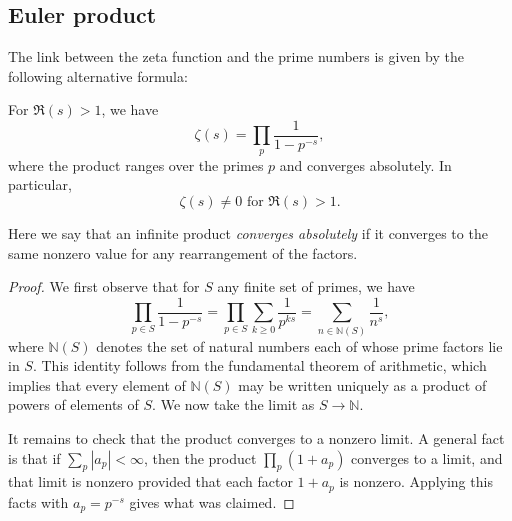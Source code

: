 \documentclass[reqno]{amsart}  \numberwithin{theorem}{section} \numberwithin{equation}{section}
\begin{document}
\subsection{Euler product}\label{sec:cj4020t3kt}
The link between the zeta function and the prime numbers is given by the following alternative formula:
\begin{lemma}
  For $\Re(s) > 1$, we have
\begin{equation*}
\zeta(s) = \prod_p \frac{1}{1 - p^{- s}},
\end{equation*}
where the product ranges over the primes $p$ and converges absolutely.  In particular,
\begin{equation*}
\zeta(s) \neq 0 \text{ for } \Re(s) > 1.
\end{equation*}
\end{lemma}
Here we say that an infinite product \emph{converges absolutely} if it converges to the same nonzero value for any rearrangement of the factors.
\begin{proof}
  We first observe that for $S$ any finite set of primes, we have
  \begin{equation*}
    \prod_{p \in S}
    \frac{1}{1 - p^{- s}}
    = \prod_{p \in S}
    \sum_{k \geq 0} \frac{1}{ p^{k s}}
    =
    \sum_{n \in \mathbb{N}(S)}
    \frac{1}{n^s},
  \end{equation*}
  where $\mathbb{N}(S)$ denotes the set of natural numbers each of whose prime factors lie in $S$.  This identity follows from the fundamental theorem of arithmetic, which implies that every element of $\mathbb{N}(S)$ may be written uniquely as a product of powers of elements of $S$.  We now take the limit as $S \rightarrow \mathbb{N}$.

  It remains to check that the product converges to a nonzero limit.  A general fact is that if $\sum_p |a_p| < \infty$, then the product $\prod_{p} (1 + a_p)$ converges to a limit, and that limit is nonzero provided that each factor $1 + a_p$ is nonzero.  Applying this facts with $a_p = p^{-s}$ gives what was claimed.
\end{proof}
\end{document}
